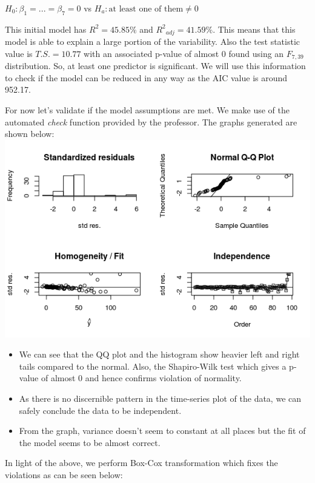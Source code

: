\documentclass{scrartcl}
\begin{document}
\begin{center}
$H_0: \beta_1=...=\beta_7=0$ vs $H_a: \text{at least one of them} \neq 0$\\
\end{center}
This initial model has $R^2 = 45.85\%$ and ${R^2}_{adj} = 41.59\%$. This means that this model is able to explain a large portion of the variability. Also the test statistic value is $T.S. = 10.77$ with an associated p-value of almost 0 found using an $F_{7,39}$ distribution. So, at least one predictor is significant. We will use this information to check if the model can be reduced in any way as the AIC value is around 952.17.
\par For now let's validate if the model assumptions are met. We make use of the automated \textit{check} function provided by the professor. The graphs generated are shown below:\\
\includegraphics[width=\textwidth]{psa_check.png}\\ 
\begin{itemize}
  \item We can see that the QQ plot and the histogram show heavier left and right tails compared to the normal. Also, the Shapiro-Wilk test which gives a p-value of almost 0 and hence confirms violation of normality. 
  \item As there is no discernible pattern in the time-series plot of the data, we can safely conclude the data to be independent.
  \item From the graph, variance doesn't seem to constant at all places but the fit of the model seems to be almost correct.
\end{itemize}
In light of the above, we perform Box-Cox transformation which fixes the violations as can be seen below:\\
\end{document}
